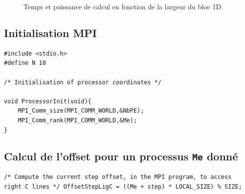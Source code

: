 \documentclass[	DIV=calc,%
							paper=a4,%
							fontsize=11pt%
							]{scrartcl}	 					%
\begin{document}
\begin{figure}
    \hfill
    \caption{Temps et puissance de calcul en fonction de la largeur du bloc 1D.}
    \label{fig:1DK1}
\end{figure}




\subsection*{Initialisation MPI}
\begin{lstlisting}
#include <stdio.h>
#define N 10

/* Initialisation of processor coordinates */

void ProcessorInit(void){
	MPI_Comm_size(MPI_COMM_WORLD,&NbPE);
  	MPI_Comm_rank(MPI_COMM_WORLD,&Me);
}
\end{lstlisting}

\newpage

\subsection*{Calcul de l'offset pour un processus {\texttt{Me} donné}}
\begin{lstlisting}
/* Compute the current step offset, in the MPI program, to access right C lines */ OffsetStepLigC = ((Me + step) * LOCAL_SIZE) % SIZE; 
\end{lstlisting}
\end{document}
